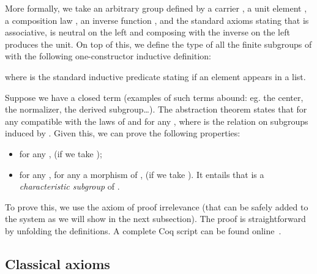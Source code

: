 \documentclass[a4paper,USenglish]{lipics}
\def\coq{\textsf{Coq}\xspace}
\begin{document}
More formally, we take an arbitrary group  defined by a
carrier , a unit element , a composition
law , an inverse function , and the standard axioms stating that  is
associative,  is neutral on the left and composing with the inverse
on the left produces the unit. On top of this, we define the type of all
the finite subgroups of  with the following one-constructor
inductive definition:

where  is the standard inductive
predicate stating if an element appears in a list.

Suppose we have a closed term  (examples of such
terms abound: eg. the center, the normalizer, the derived
subgroup\dots). The abstraction
theorem states that for any  compatible
with the laws of  and for any ,  where  is the relation
on subgroups induced by . Given this, we can prove the following
properties:
\begin{itemize}
\item for any ,  (if we take );
\item for any , for any  a morphism of ,
   (if we take ).
  It entails that  is a \emph{characteristic subgroup} of
  .
\end{itemize}
To prove this, we use the axiom of proof irrelevance (that can be safely
added to the system as we will show in the next subsection). The proof
is straightforward by unfolding the definitions. A complete \coq script
can be found online~\cite{implem12}.


\subsection{Classical axioms}\label{sec:examples:axioms}
\end{document}
